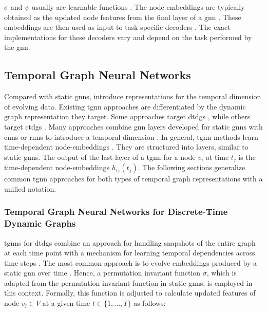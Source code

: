 $\sigma$ and $\psi$ usually are learnable functions \cite{bronstein_geometric_2021}. The node embeddings are typically obtained as the updated node features from the final layer of a \gls{gnn} \cite{hamilton_representation_2017}. These embeddings are then used as input to task-specific decoders \cite{hamilton_representation_2017}. The exact implementations for these decoders vary and depend on the task performed by the \gls{gnn}.

\subsection{Temporal Graph Neural Networks}
\label{s_Background_TGNNs}

Compared with static \glspl{gnn},  introduce representations for the temporal dimension of evolving data. Existing \gls{tgnn} approaches are differentiated by the dynamic graph representation they target. Some approaches target \glspl{dtdg} \cite{sankar_dysat_2020, manessi_dynamic_2020, you_roland_2022}, while others target \glspl{ctdg} \cite{rossi_temporal_2020, souza_provably_2022, ma_streaming_2018}.
Many approaches combine \gls{gnn} layers developed for static \glspl{gnn} with \glspl{cnn} or \glspl{rnn} to introduce a temporal dimension \cite{wu_comprehensive_2021}. In general, \gls{tgnn} methods learn time-dependent node-embeddings \cite{longa_graph_2023}. They are structured into layers, similar to static \glspl{gnn}. The output of the last layer of a \gls{tgnn} for a node $v_i$ at time $t_j$ is the time-dependent node-embeddings $h_{v_i}(t_j)$.
The following sections generalize common \gls{tgnn} approaches for both types of temporal graph representations with a unified notation.

\subsubsection{Temporal Graph Neural Networks for Discrete-Time Dynamic Graphs}
\label{s_tgnns_for_dtdgs}
\glspl{tgnn} for \glspl{dtdg} combine an approach for handling snapshots of the entire graph at each time point with a mechanism for learning temporal dependencies across time steps \cite{longa_graph_2023}. The most common approach is to evolve embeddings produced by a static \gls{gnn} over time \cite{longa_graph_2023}. Hence, a permutation invariant function $\sigma$, which is adapted from the permutation invariant function in static \glspl{gnn}, is employed in this context. Formally, this function is adjusted to calculate updated features of node $v_i \in V$ at a given time $t \in \{1,...,T\}$ as follows:

